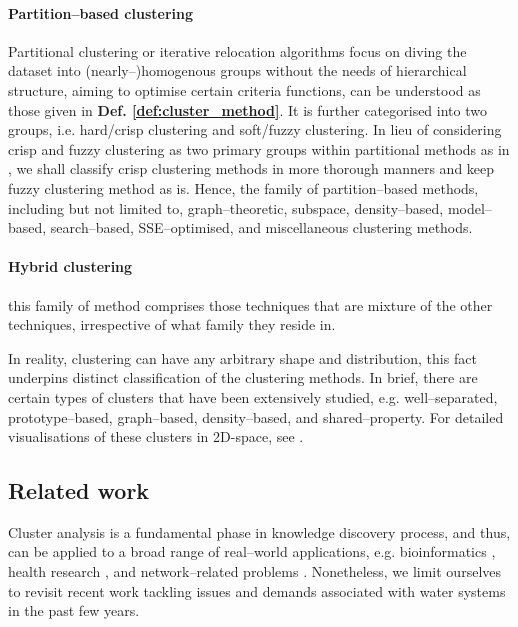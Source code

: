 \paragraph{Partition–based clustering} Partitional clustering or iterative relocation algorithms focus on diving the dataset into (nearly–)homogenous groups without the needs of hierarchical structure, aiming to optimise certain criteria functions, can be understood as those given in \textbf{Def. \ref{def:cluster_method}}.
It is further categorised into two groups, i.e. hard/crisp clustering and soft/fuzzy clustering.
In lieu of considering crisp and fuzzy clustering as two primary groups within partitional methods as in \cite{ref_1, ref_2}, we shall classify crisp clustering methods in more thorough manners and keep fuzzy clustering method as is.
Hence, the family of partition–based methods, including but not limited to, graph–theoretic, subspace, density–based, model–based, search–based, SSE–optimised, and miscellaneous clustering methods.

\paragraph{Hybrid clustering} this family of method comprises those techniques that are mixture of the other techniques, irrespective of what family they reside in.

In reality, clustering can have any arbitrary shape and distribution, this fact underpins distinct classification of the clustering methods.
In brief, there are certain types of clusters that have been extensively studied, e.g. well–separated, prototype–based, graph–based, density–based, and shared–property. For detailed visualisations of these clusters in 2D-space, see \cite{ref_10}.


\subsection{Related work}
\label{sec:background:priorwork}

Cluster analysis is a fundamental phase in knowledge discovery process, and thus, can be applied to a broad range of real–world applications, e.g. bioinformatics \cite{ref_4}, health research \cite{ref_12}, and network–related problems \cite{ref_3}.
Nonetheless, we limit ourselves to revisit recent work tackling issues and demands associated with water systems in the past few years.


